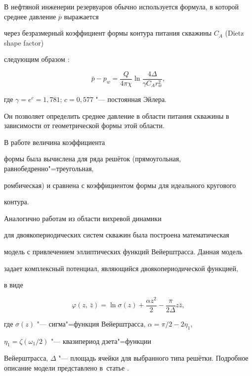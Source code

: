 В нефтяной инженерии резервуаров обычно используется формула, в которой среднее давление $\bar{p}$ выражается

через безразмерный коэффициент формы контура питания скважины $C_A$ (Dietz shape factor)

\cite{roters:bib:Dake} следующим образом \cite{roters:bib:Dietz}:

\begin{equation}

\bar{p}-p_{w}=\frac{Q}{4\pi\chi}\ln\frac{4\Delta}{\gamma C_A r_w^2},

\label{eq:d_Ca}

\end{equation}

где $\gamma=e^c=1,781$; $c=0,577$ "--- постоянная Эйлера.

Он позволяет определить среднее давление в области питания скважины в зависимости от геометрической формы этой области.

В работе \cite{roters:bib:Dietz} величина коэффициента

формы была вычислена для ряда решёток (прямоугольная, равнобедренно"=треугольная,

ромбическая) и сравнена с коэффициентом формы для идеального кругового

контура.



Аналогично работам из области вихревой динамики \cite{roters:bib:ONeil,roters:bib:Tkachenko}

для двоякопериодических систем скважин была построена математическая

модель с привлечением эллиптических функций Вейерштрасса. Данная модель

задает комплексный потенциал, являющийся двоякопериодической функцией,

в виде

\begin{equation}

\varphi(z,\,\bar{z})=\ln\sigma(z)+\frac{\alpha z^2}{2}-\frac{\pi}{2\Delta}z\bar{z},

\end{equation}

где $\sigma(z)$ "--- сигма"=функция Вейерштрасса, $\alpha={\pi}/{2}-2\eta_1$,

$\eta_1=\zeta\left(\omega_{1}/2\right)$ "--- квазипериод дзета"=функции

Вейерштрасса, $\Delta$ "--- площадь ячейки для выбранного типа решётки. Подробное описание модели представлено в~статье \cite{roters:bib:Ast_Roters}.



